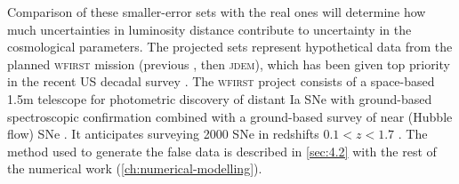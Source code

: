 Comparison of these smaller-error sets with the real ones will determine how much uncertainties in luminosity distance contribute to uncertainty in the cosmological parameters. The projected sets represent hypothetical data from the planned \textsc{wfirst} mission (previous \snap{}, then \textsc{jdem}), which has been given top priority in the recent US decadal survey \cite{Blandford2010}. The \textsc{wfirst} project consists of a space-based 1.5m telescope for photometric discovery of distant Ia SNe with ground-based spectroscopic confirmation combined with a ground-based survey of near (Hubble flow) SNe \cite{Albrecht2006}. It anticipates surveying 2000 SNe in redshifts $0.1 < z < 1.7$ \cite{Blandford2010}. The method used to generate the false data is described in \cref{sec:4.2} with the rest of the numerical work (\cref{ch:numerical-modelling}).
